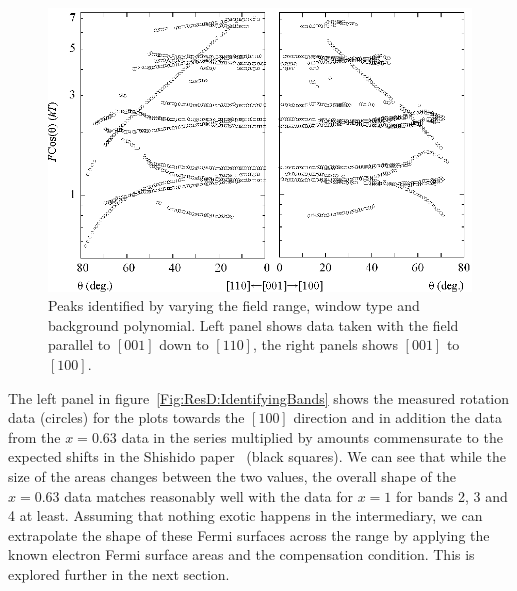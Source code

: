 \begin{figure}[htbp]
    \begin{center}
        \includegraphics[scale=0.9]{Chapter-dHvABaFe2P2/Figures/AngleDepMeasurements/AngleSweepMeasured/AngleSweepMeasured}
        \caption{Peaks identified by varying the field range, window type and background polynomial. Left panel shows data taken with the field parallel to $[001]$ down to $[110]$, the right panels shows $[001]$ to $[100]$.}
        \label{Fig:ResD:AngleSweepMeasured}
    \end{center}
\end{figure}

The left panel in figure~\ref{Fig:ResD:IdentifyingBands} shows the measured rotation data (circles) for the plots towards the $[100]$ direction and in addition the data from the $x=0.63$ data in the \BaFePAs series multiplied by amounts commensurate to the expected shifts in the Shishido paper~\cite{Shishido2010} (black squares). We can see that while the size of the areas changes between the two values, the overall shape of the $x=0.63$ data matches reasonably well with the data for $x=1$ for bands 2, 3 and 4 at least. Assuming that nothing exotic happens in the intermediary, we can extrapolate the shape of these Fermi surfaces across the range by applying the known electron Fermi surface areas and the compensation condition. This is explored further in the next section.

